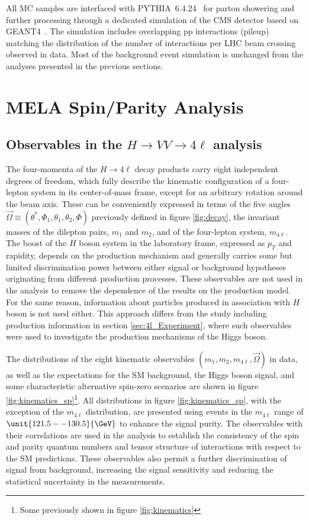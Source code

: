 All MC samples are interfaced with \textsc{PYTHIA}~6.4.24~\cite{Sjostrand:2006za} for parton showering and further processing through a dedicated simulation of the CMS detector based on \textsc{GEANT4}~\cite{Agostinelli2003250}. The simulation includes overlapping pp interactions (pileup) matching the distribution of the number of interactions per LHC beam crossing observed in data. Most of the background event simulation is unchanged from the analyses presented in the previous sections.


\section{MELA Spin/Parity Analysis}
\label{sec:MELA_SpinParity}

\subsection{Observables in the $H \to VV \to 4\ell$ analysis}
\label{sec:Observables_spinparity}

The four-momenta of the $H \to 4\ell$ decay products carry eight independent degrees of freedom,
which fully describe the kinematic configuration of a four-lepton system in its center-of-mass frame, except for an arbitrary
rotation around the beam axis. These can be conveniently expressed in terms of the five angles
$\vec\Omega\equiv(\theta^*, \Phi_1, \theta_1, \theta_2, \Phi)$ previously defined in figure \ref{fig:decay}, the invariant masses of the dilepton pairs, $m_{1}$ and $m_2$, and of the four-lepton system, $m_{4\ell}$.
The boost of the $H$ boson system in the laboratory frame, expressed as $p_{T}$ and rapidity, depends on the production
mechanism and generally carries some but limited discrimination power between either signal or background
hypotheses originating from different production processes. These observables are not used in the analysis
to remove the dependence of the results on the production model. For the same reason, information about particles
produced in association with $H$ boson is not used either. This approach differs from the study including production information in section \ref{sec:4l_Experiment}, where such observables were used to investigate the production mechanisms of the Higgs boson.

The distributions of the eight kinematic observables $(m_1, m_2, m_{4\ell}, \vec\Omega)$ in data,
as well as the expectations for the SM background, the Higgs boson signal, and some characteristic alternative
spin-zero scenarios are shown in figure \ref{fig:kinematics_sp}\footnote{Some previously shown in figure \ref{fig:kinematics}}. All distributions in figure \ref{fig:kinematics_sp}, with the exception of the $m_{4\ell}$ distribution, are presented using events in the $m_{4\ell}$ range of $\unit{121.5--130.5}{\GeV}$ to enhance the signal purity. The observables with their correlations are used in the analysis to establish the consistency of the spin and parity quantum numbers and tensor structure of interactions with respect to the SM predictions. These observables also permit a further discrimination of signal from background, increasing the signal sensitivity and reducing the statistical uncertainty in the measurements.

